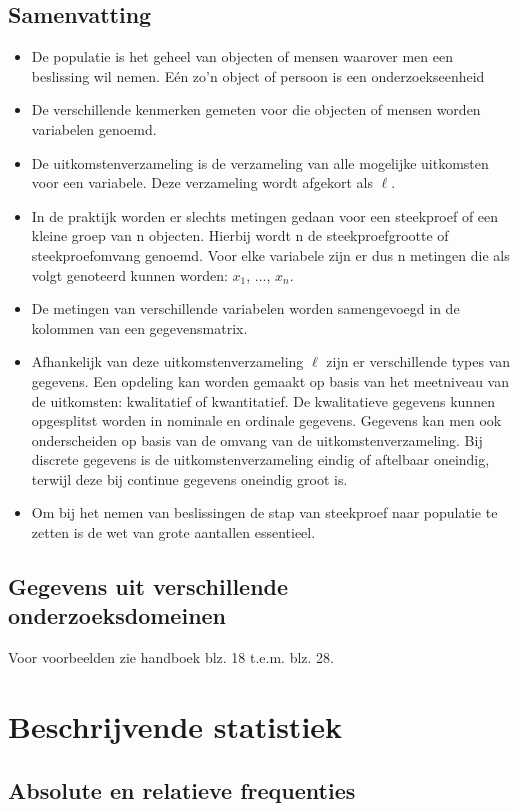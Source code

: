 \documentclass[titlepage]{article}
\numberwithin{equation}{section}
\begin{document}
\subsection{Samenvatting}
\begin{itemize}
	\item De populatie is het geheel van objecten of mensen waarover men een beslissing wil nemen. Eén zo'n object of persoon is een onderzoekseenheid
	\item De verschillende kenmerken gemeten voor die objecten of mensen worden variabelen genoemd.
	\item De uitkomstenverzameling is de verzameling van alle mogelijke uitkomsten voor een variabele. Deze verzameling wordt afgekort als $\ell$.
	\item In de praktijk worden er slechts metingen gedaan voor een steekproef of een kleine groep van n objecten. Hierbij wordt n de steekproefgrootte of steekproefomvang genoemd. Voor elke variabele zijn er dus n metingen die als volgt genoteerd kunnen worden: $x_{1}$, ..., $x_{n}$.
	\item De metingen van verschillende variabelen worden samengevoegd in de kolommen van een gegevensmatrix.
	\item Afhankelijk van deze uitkomstenverzameling $\ell$ zijn er verschillende types van gegevens. Een opdeling kan worden gemaakt op basis van het meetniveau van de uitkomsten: kwalitatief of kwantitatief. De kwalitatieve gegevens kunnen opgesplitst worden in nominale en ordinale gegevens. Gegevens kan men ook onderscheiden op basis van de omvang van de uitkomstenverzameling. Bij discrete gegevens is de uitkomstenverzameling eindig of aftelbaar oneindig, terwijl deze bij continue gegevens oneindig groot is.
	\item Om bij het nemen van beslissingen de stap van steekproef naar populatie te zetten is de wet van grote aantallen essentieel.
\end{itemize}
\subsection{Gegevens uit verschillende onderzoeksdomeinen}
Voor voorbeelden zie handboek blz. 18 t.e.m. blz. 28.
\section{Beschrijvende statistiek}
\subsection{Absolute en relatieve frequenties}
\end{document}

